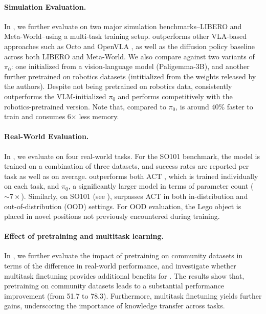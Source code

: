 \paragraph{Simulation Evaluation.}
In , we further evaluate \ours on two major simulation benchmarks--LIBERO and Meta-World--using a multi-task training setup. \ours{} outperforms other VLA-based approaches such as Octo \citep{team2024octo} and OpenVLA \citep{kimopenvla}, as well as the diffusion policy baseline across both LIBERO and Meta-World. We also compare against two variants of $\pi_0$: one initialized from a vision-language model (Paligemma-3B), and another further pretrained on robotics datasets (intitialized from the weights released by the authors). Despite not being pretrained on robotics data, \ours{} consistently outperforms the VLM-initialized $\pi_0$ and performs competitively with the robotics-pretrained version. Note that, compared to $\pi_0$, \ours is around 40\% faster to train and consumes 6$\times$ less memory.



\paragraph{Real-World Evaluation.}
In , we evaluate \ours{} on four real-world tasks. For the SO101 benchmark, the model is trained on a combination of three datasets, and success rates are reported per task as well as on average. \ours{} outperforms both ACT \citep{zhao2023learningact}, which is trained individually on each task, and \( \pi_0 \), a significantly larger model in terms of parameter count (\( \sim 7\times\)). 
Similarly, on SO101 (see ), \ours{} surpasses ACT in both in-distribution and out-of-distribution (OOD) settings. For OOD evaluation, the Lego object is placed in novel positions not previously encountered during training.



\paragraph{Effect of pretraining and multitask learning.} In , we further evaluate the impact of pretraining \ours on community datasets in terms of the difference in real-world performance, and investigate whether multitask finetuning provides additional benefits for \ours. The results show that, pretraining on community datasets leads to a substantial performance improvement (from 51.7 to 78.3). 
Furthermore, multitask finetuning yields further gains, underscoring the importance of knowledge transfer across tasks.

